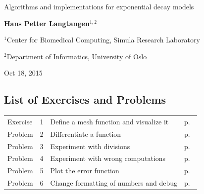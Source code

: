 \documentclass[%
oneside,                 %
final,                   %
10pt]{article}
\begin{document}







\thispagestyle{empty}

\begin{center}
{\LARGE\bf
\begin{spacing}{1.25}
Algorithms and implementations for exponential decay models
\end{spacing}
}
\end{center}


\begin{center}
{\bf Hans Petter Langtangen${}^{1, 2}$} \\ [0mm]
\end{center}

\begin{center}
\centerline{{\small ${}^1$Center for Biomedical Computing, Simula Research Laboratory}}
\centerline{{\small ${}^2$Department of Informatics, University of Oslo}}
\end{center}
    

\begin{center}
Oct 18, 2015
\end{center}

\vspace{1cm}


\tableofcontents

\clearpage %
\subsection*{List of Exercises and Problems}
\begin{tabular}{lrll}
Exercise & 1 & Define a mesh function and visualize it & p.~\pageref{decay:exer:meshfunc} \\
Problem & 2 & Differentiate a function & p.~\pageref{decay:exer:dudt} \\
Problem & 3 & Experiment with divisions & p.~\pageref{decay:exer:intdiv} \\
Problem & 4 & Experiment with wrong computations & p.~\pageref{decay:exer:decay1err} \\
Problem & 5 & Plot the error function & p.~\pageref{decay:exer:plot:error} \\
Problem & 6 & Change formatting of numbers and debug & p.~\pageref{decay:exer:inexact:output} \\
\end{tabular}
\clearpage %
\end{document}
